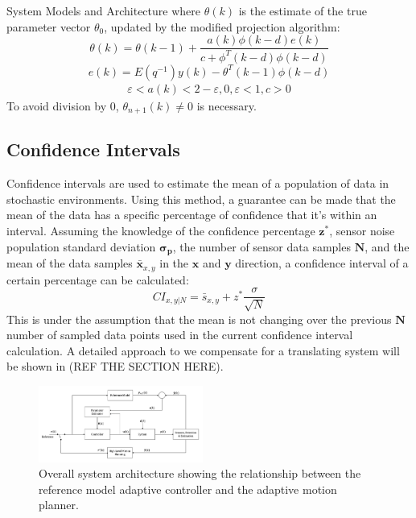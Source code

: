 \begin{section}{System Models and Architecture}
where $\theta(k)$ is the estimate of the true parameter vector $\theta_0$, updated by the modified projection algorithm:
	\begin{equation}
	\theta(k)=\theta(k-1)+\frac{a(k)\phi(k-d)e(k)}{c+\phi^T(k-d)\phi(k-d)}
	\end{equation}
	\begin{equation}
	e(k)=E(q^{-1})y(k)-\theta^T(k-1)\phi(k-d)
	\end{equation}
	\begin{align*}
	\varepsilon<a(k)<2-\varepsilon, 0,\varepsilon<1, c>0
	\end{align*}
To avoid division by 0, $\theta_{n+1}(k)\neq0$ is necessary.


 \subsection{Confidence Intervals}

Confidence intervals are used to estimate the mean of a population of data in stochastic environments. Using this method, a guarantee can be made that the mean of the data has a specific percentage of confidence that it's within an interval. Assuming the knowledge of the confidence percentage $ \bm{z^{*}} $, sensor noise population standard deviation $ \bm{\sigma_p} $, the number of sensor data samples $ \bm{N} $, and the mean of the data samples $ \bm{\bar{x}}_{x,y} $ in the $\bm{x}$ and $\bm{y}$ direction, a confidence interval of a certain percentage can be calculated: 
 	\begin{equation}
		CI_{x,y|N} = \bar{s}_{x,y} + z^{*}\frac{\sigma}{\sqrt{N}}
	\end{equation}
This is under the assumption that the mean is not changing over the previous $\bm{N}$ number of sampled data points used in the current confidence interval calculation. A detailed approach to we compensate for a translating system will be shown in (REF THE SECTION HERE).



\begin{figure}
\vspace{1pt}
\centering
\includegraphics[width=0.48\textwidth]{sys_arch.png}
\caption{Overall system architecture showing the relationship between the reference model adaptive controller and the adaptive motion planner.}
\label{fig:system_arch}
\end{figure}



\end{section}